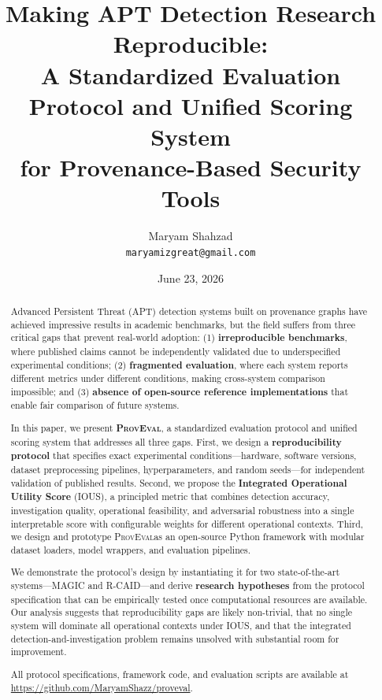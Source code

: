 \documentclass[11pt,a4paper]{article}
\newcommand{\system}[1]{\textsc{#1}}
\newcommand{\ious}{\textsc{IOUS}}
\newcommand{\proveval}{\textsc{ProvEval}}
\begin{document}
\title{\textbf{Making APT Detection Research Reproducible:\\A Standardized Evaluation Protocol and Unified Scoring System\\for Provenance-Based Security Tools}}

\author{Maryam Shahzad\\
\texttt{maryamizgreat@gmail.com}}

\date{June 23, 2026}

\maketitle

\begin{abstract}
Advanced Persistent Threat (APT) detection systems built on provenance graphs have achieved impressive results in academic benchmarks, but the field suffers from three critical gaps that prevent real-world adoption: (1) \textbf{irreproducible benchmarks}, where published claims cannot be independently validated due to underspecified experimental conditions; (2) \textbf{fragmented evaluation}, where each system reports different metrics under different conditions, making cross-system comparison impossible; and (3) \textbf{absence of open-source reference implementations} that enable fair comparison of future systems.

In this paper, we present \textbf{\proveval}, a standardized evaluation protocol and unified scoring system that addresses all three gaps. First, we design a \textbf{reproducibility protocol} that specifies exact experimental conditions---hardware, software versions, dataset preprocessing pipelines, hyperparameters, and random seeds---for independent validation of published results. Second, we propose the \textbf{Integrated Operational Utility Score} (\ious), a principled metric that combines detection accuracy, investigation quality, operational feasibility, and adversarial robustness into a single interpretable score with configurable weights for different operational contexts. Third, we design and prototype \proveval as an open-source Python framework with modular dataset loaders, model wrappers, and evaluation pipelines.

We demonstrate the protocol's design by instantiating it for two state-of-the-art systems---\system{MAGIC} and \system{R-CAID}---and derive \textbf{research hypotheses} from the protocol specification that can be empirically tested once computational resources are available. Our analysis suggests that reproducibility gaps are likely non-trivial, that no single system will dominate all operational contexts under \ious, and that the integrated detection-and-investigation problem remains unsolved with substantial room for improvement.

All protocol specifications, framework code, and evaluation scripts are available at \url{https://github.com/MaryamShazz/proveval}.
\end{abstract}
\end{document}

